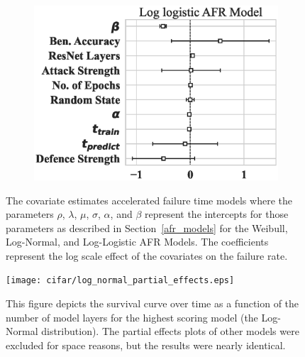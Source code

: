\begin{figure}
\begin{subfigure}[t]{0.3\textwidth}
        \includegraphics[width=\textwidth]{cifar/log_logistic_aft.eps}
    \end{subfigure}
    
    \caption{The covariate estimates accelerated failure time models where the parameters $\rho$, $\lambda$, $\mu$, $\sigma$, $\alpha$, and $\beta$ represent the intercepts for those parameters as described in Section~\ref{afr_models} for the Weibull, Log-Normal, and Log-Logistic AFR Models. The coefficients represent the log scale effect of the covariates on the failure rate.}
    \label{fig:cifar_afr_models}
\end{figure}

\begin{figure}
    \centering\texttt{[image: cifar/log\_normal\_partial\_effects.eps]}
    \caption{This figure depicts the survival curve over time as a function of the number of model layers for the highest scoring model (the Log-Normal distribution). The partial effects plots of other models were excluded for space reasons, but the results were nearly identical.}
    \label{fig:cifar_layers}
\end{figure}


